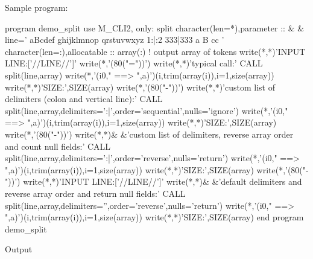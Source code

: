 Sample program\+: \begin{DoxyVerb}program demo_split
use M_CLI2, only: split
character(len=*),parameter     :: &
& line='  aBcdef   ghijklmnop qrstuvwxyz  1:|:2     333|333 a B cc    '
character(len=:),allocatable :: array(:) ! output array of tokens
   write(*,*)'INPUT LINE:['//LINE//']'
   write(*,'(80("="))')
   write(*,*)'typical call:'
   CALL split(line,array)
   write(*,'(i0," ==> ",a)')(i,trim(array(i)),i=1,size(array))
   write(*,*)'SIZE:',SIZE(array)
   write(*,'(80("-"))')
   write(*,*)'custom list of delimiters (colon and vertical line):'
   CALL split(line,array,delimiters=':|',order='sequential',nulls='ignore')
   write(*,'(i0," ==> ",a)')(i,trim(array(i)),i=1,size(array))
   write(*,*)'SIZE:',SIZE(array)
   write(*,'(80("-"))')
   write(*,*)&
 &'custom list of delimiters, reverse array order and count null fields:'
   CALL split(line,array,delimiters=':|',order='reverse',nulls='return')
   write(*,'(i0," ==> ",a)')(i,trim(array(i)),i=1,size(array))
   write(*,*)'SIZE:',SIZE(array)
   write(*,'(80("-"))')
   write(*,*)'INPUT LINE:['//LINE//']'
   write(*,*)&
   &'default delimiters and reverse array order and return null fields:'
   CALL split(line,array,delimiters='',order='reverse',nulls='return')
   write(*,'(i0," ==> ",a)')(i,trim(array(i)),i=1,size(array))
   write(*,*)'SIZE:',SIZE(array)
end program demo_split
\end{DoxyVerb}


Output

